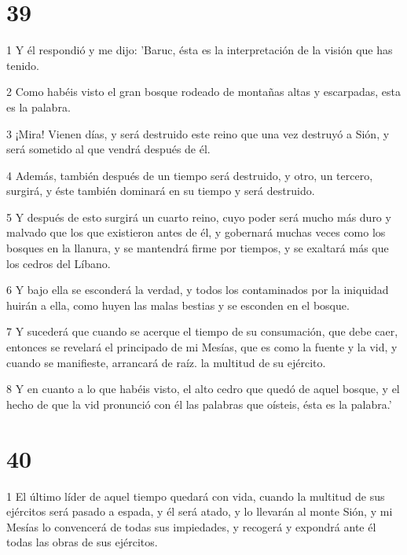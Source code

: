 \chapter{39}

\par 1 Y él respondió y me dijo: 'Baruc, ésta es la interpretación de la visión que has tenido.

\par 2 Como habéis visto el gran bosque rodeado de montañas altas y escarpadas, esta es la palabra.

\par 3 ¡Mira! Vienen días, y será destruido este reino que una vez destruyó a Sión, y será sometido al que vendrá después de él.

\par 4 Además, también después de un tiempo será destruido, y otro, un tercero, surgirá, y éste también dominará en su tiempo y será destruido.

\par 5 Y después de esto surgirá un cuarto reino, cuyo poder será mucho más duro y malvado que los que existieron antes de él, y gobernará muchas veces como los bosques en la llanura, y se mantendrá firme por tiempos, y se exaltará más que los cedros del Líbano.

\par 6 Y bajo ella se esconderá la verdad, y todos los contaminados por la iniquidad huirán a ella, como huyen las malas bestias y se esconden en el bosque.

\par 7 Y sucederá que cuando se acerque el tiempo de su consumación, que debe caer, entonces se revelará el principado de mi Mesías, que es como la fuente y la vid, y cuando se manifieste, arrancará de raíz. la multitud de su ejército.

\par 8 Y en cuanto a lo que habéis visto, el alto cedro que quedó de aquel bosque, y el hecho de que la vid pronunció con él las palabras que oísteis, ésta es la palabra.'

\chapter{40}

\par 1 El último líder de aquel tiempo quedará con vida, cuando la multitud de sus ejércitos será pasado a espada, y él será atado, y lo llevarán al monte Sión, y mi Mesías lo convencerá de todas sus impiedades, y recogerá y expondrá ante él todas las obras de sus ejércitos.

